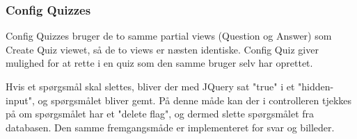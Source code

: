 \subsubsection{Config Quizzes}

Config Quizzes bruger de to samme partial views (Question og Answer) som Create Quiz viewet, så de to views er næsten identiske. Config Quiz giver mulighed for at rette i en quiz som den samme bruger selv har oprettet.

Hvis et spørgsmål skal slettes, bliver der med JQuery sat "true" i et "hidden-input", og spørgsmålet bliver gemt. På denne måde kan der i controlleren tjekkes på om spørgsmålet har et "delete flag", og dermed slette spørgsmålet fra databasen.
Den samme fremgangsmåde er implementeret for svar og billeder.